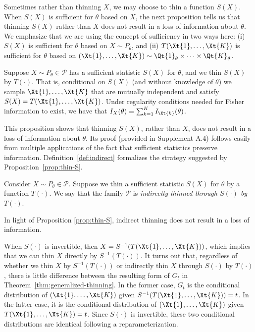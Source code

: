 \documentclass[12pt]{article}
\begin{document}
Sometimes rather than thinning $X$, we may choose  to thin a function $S(X)$.  When $S(X)$ is sufficient for $\theta$ based on $X$, the next proposition tells us that  thinning $S(X)$ rather than $X$ does not result in a loss of  information about $\theta$.  We emphasize that we are using the concept of sufficiency in two ways  here: (i) $S(X)$ is sufficient for $\theta$ based on $X\sim P_\theta$, and (ii)  $T(\Xt{1},\ldots,\Xt{K})$  is sufficient for $\theta$ based on $(\Xt{1},\ldots,\Xt{K})\sim \Qt{1}_\theta\times\cdots\times\Qt{K}_\theta$.  

\begin{proposition}\label{prop:thin-S}
Suppose $X\sim P_\theta\in\mathcal P$ has a sufficient statistic $S(X)$ for $\theta$, and we thin $S(X)$ by  $T(\cdot)$. That is, conditional on $S(X)$ (and without knowledge of $\theta$) we sample $\Xt{1},\ldots,\Xt{K}$ that are mutually independent and satisfy
$S(X)=T(\Xt{1},\ldots,\Xt{K})$.
Under regularity conditions 
needed for Fisher information to exist, we have that
$I_X(\theta)=\sum_{k=1}^K I_{\Xt{k}}(\theta)$.
\end{proposition}

This proposition shows that thinning $S(X)$, rather than $X$, does not result in a loss of information about $\theta$.  
Its proof (provided in Supplement A.4) follows easily from multiple applications of the fact that sufficient statistics preserve information.
Definition~\ref{def:indirect} formalizes the strategy suggested by Proposition~\ref{prop:thin-S}.

\begin{definition} 
\label{def:indirect}
Consider $X\sim P_\theta\in \mathcal P$. Suppose we thin a sufficient statistic $S(X)$ for $\theta$ by a function $T(\cdot)$. 
We say that the family $\mathcal P$ is {\em indirectly thinned through $S(\cdot)$ by $T(\cdot)$}. 
\end{definition}
In light of Proposition \ref{prop:thin-S}, indirect thinning does not result in a loss of information.

When $S(\cdot)$ is invertible, then
$X=S^{-1}(T(\Xt{1},\ldots,\Xt{K}))$,
which implies that we can thin $X$ directly by $S^{-1}(T(\cdot))$.
It turns out that, regardless of whether we thin $X$ by $S^{-1}(T(\cdot))$ or indirectly thin $X$ through $S(\cdot)$ by $T(\cdot)$, there is little difference between the resulting form of $G_t$ in Theorem~\ref{thm:generalized-thinning}. In the former case, $G_t$ is the conditional distribution of $(\Xt{1},\dots,\Xt{K})$ given $S^{-1}( T(\Xt{1},\dots,\Xt{K}))=  t$. In the  latter case, it is  the conditional distribution of $(\Xt{1},\dots,\Xt{K})$ given $ T(\Xt{1},\dots,\Xt{K})=  t$. Since $S(\cdot)$ is invertible, these two conditional distributions are identical following a reparameterization. 
\end{document}
